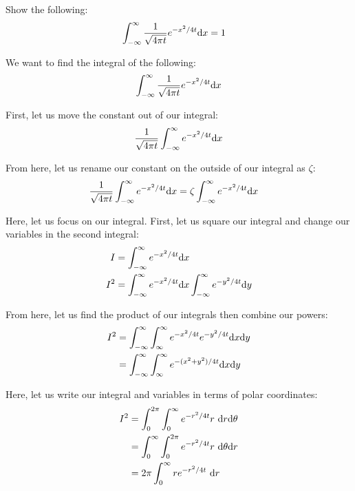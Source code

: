 \item Show the following:
%
\begin{align*}
  \int^\infty_{-\infty} \frac{1}{\sqrt{4 \pi t}} e^{-x^2/4t} \text dx & = 1
\end{align*}
\bigbreak

We want to find the integral of the following:
%
\begin{align}
  \int^\infty_{-\infty} \frac{1}{\sqrt{4 \pi t}} e^{-x^2 / 4t} \text dx
\end{align}

First, let us move the constant out of our integral:
%
\begin{align}
  \frac{1}{\sqrt{4 \pi t}} \int^\infty_{-\infty} e^{-x^2 / 4t} \text dx
\end{align}

From here, let us rename our constant on the outside of our integral as $\zeta$:
%
\begin{align}
  \frac{1}{\sqrt{4 \pi t}} \int^\infty_{-\infty} e^{-x^2 / 4t} \text dx
  & = \zeta \int^\infty_{-\infty} e^{-x^2 / 4t} \text dx
\end{align}


Here, let us focus on our integral. First, let us square our integral and change our variables in the second integral:
%
\begin{align}
  I   & = \int^\infty_{-\infty} e^{-x^2/4t} \text dx\\
  I^2 & = \int^\infty_{-\infty} e^{-x^2/4t} \text dx
          \int^\infty_{-\infty} e^{-y^2/4t} \text dy
\end{align}

From here, let us find the product of our integrals then combine our powers:
%
\begin{align}
  I^2
  & = \int^\infty_{-\infty} \int^\infty_{\infty}
      e^{-x^2/4t} e^{-y^2/4t} \text dx \text dy\\
  & = \int^\infty_{-\infty} \int^\infty_{\infty}
      e^{-(x^2 + y^2)/4t} \text dx \text dy\\
\end{align}

Here, let us write our integral and variables in terms of polar
coordinates:
%
\begin{align}
  I^2
  & = \int^{2\pi}_0 \int^\infty_0
      e^{-r^2/4t} r\ \text dr \text d \theta \\
  & = \int^\infty_0 \int^{2\pi}_0
      e^{-r^2/4t} r\ \text d \theta \text dr\\
  & = 2 \pi \int^\infty_0
      r e^{-r^2/4t} \ \text dr\\
\end{align}

